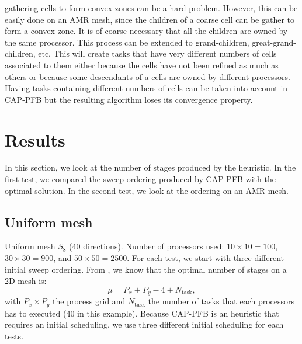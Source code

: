 \documentclass[letterpaper]{article}
\renewcommand{\(}{\left(}
\renewcommand{\)}{\right)}
\renewcommand{\[}{\left[}
\renewcommand{\]}{\right]}
\begin{document}
gathering cells to form convex zones can be a hard problem. However, this can be
easily done on an AMR mesh, since the children of a coarse cell can be gather to
form a convex zone. It is of coarse necessary that all the children are owned by
the same processor. This process can be extended to grand-children,
great-grand-children, etc. This will create tasks that have very different
numbers of cells associated to them either because the cells have not been
refined as much as others or because some descendants of a cells are owned by
different processors. Having tasks containing different numbers of cells can be
taken into account in CAP-PFB but the resulting algorithm loses its convergence
property. 


\section{Results}
In this section, we look at the number of stages produced by the heuristic. In
the first test, we compared the sweep ordering produced by CAP-PFB with the
optimal solution. In the second test, we look at the ordering on an AMR mesh.
\subsection{Uniform mesh}
Uniform mesh $S_8$ (40 directions). Number of processors used: $10\times10=100$, 
$30\times30=900$, and $50\times50=2500$. For each test, we 
start with three different initial sweep ordering. From \cite{Adams2013}, we know
that the optimal number of stages on a 2D mesh is:
\begin{equation}
  \mu = P_x + P_y - 4 + N_{\textrm{task}},
\end{equation}
with $P_x \times P_y$ the process grid and $N_{\textrm{task}}$ the number of
tasks that each processors has to executed (40 in this example). Because CAP-PFB
is an heuristic that requires an initial scheduling, we use three different
initial scheduling for each tests.
\end{document}
